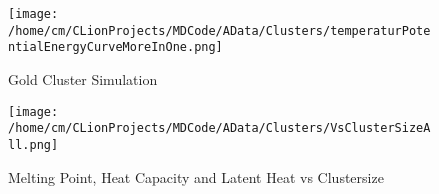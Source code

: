 \begin{figure}[!h] 
    \begin{center} 
        \texttt{[image: /home/cm/CLionProjects/MDCode/AData/Clusters/temperaturPotentialEnergyCurveMoreInOne.png]} 
    \end{center} 
    \caption[Gold Cluster Simulation]{Gold Cluster Simulation} 
    \label{GoldClusterSimulationTemperaturEnergy4In1} 
\end{figure} 
 
\begin{figure}[!h] 
    \begin{center} 
        \texttt{[image: /home/cm/CLionProjects/MDCode/AData/Clusters/VsClusterSizeAll.png]} 
    \end{center} 
    \caption[Melting Point, Heat Capacity and Latent Heat vs Clustersize]{Melting Point, Heat Capacity and Latent Heat vs Clustersize} 
    \label{GoldClusterSimulationVsClustersize} 
\end{figure} 
 
